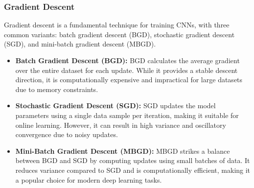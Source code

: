 \subsubsection{Gradient Descent}

Gradient descent is a fundamental technique for training CNNs, with three common variants: batch gradient descent (BGD), stochastic gradient descent (SGD), and mini-batch gradient descent (MBGD).

\begin{itemize}
	\item \textbf{Batch Gradient Descent (BGD):} BGD calculates the average gradient over the entire dataset for each update. While it provides a stable descent direction, it is computationally expensive and impractical for large datasets due to memory constraints.
	\item \textbf{Stochastic Gradient Descent (SGD):} SGD updates the model parameters using a single data sample per iteration, making it suitable for online learning. However, it can result in high variance and oscillatory convergence due to noisy updates.
	\item \textbf{Mini-Batch Gradient Descent (MBGD):} MBGD strikes a balance between BGD and SGD by computing updates using small batches of data. It reduces variance compared to SGD and is computationally efficient, making it a popular choice for modern deep learning tasks.
\end{itemize}

